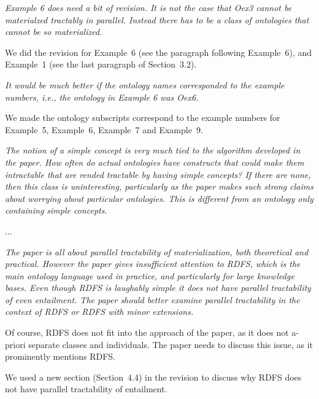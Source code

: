 \documentclass{article}
\let\quoteOld\quote
\let\endquoteOld\endquote
\renewenvironment{quote}{\quoteOld\itshape}{\endquoteOld}
\begin{document}
\begin{quote}
Example 6 does need a bit of revision.  It is not the case that Oex3 cannot
be materialzed tractably in parallel.  Instead there has to be a class of
ontologies that cannot be so materialized.
\end{quote}

We did the revision for Example~6 (see the paragraph following Example~6),
and Example~1 (see the last paragraph of Section~3.2).


\begin{quote}
It would be much better if the ontology names corresponded to the example
numbers, i.e., the ontology in Example 6 was Oex6.
\end{quote}

We made the ontology subscripts correspond to the example numbers
for Example~5, Example~6, Example~7 and Example~9.


\begin{quote}
The notion of a simple concept is very much tied to the algorithm developed
in the paper.  How often do actual ontologies have constructs that could
make them intractable that are rended tractable by having simple concepts?
If there are none, then this class is uninteresting, particularly as the
paper makes such strong claims about worrying about particular ontologies.
This is different from an ontology only containing simple concepts.
\end{quote}

...

\begin{quote}
The paper is all about parallel tractability of materialization, both
theoretical and practical.  However the paper gives insufficient attention
to RDFS, which is the main ontology language used in practice, and
particularly for large knowledge bases.  Even though RDFS is laughably
simple it does not have parallel tractability of even entailment.  The paper
should better examine parallel tractability in the context of RDFS or RDFS
with minor extensions.

Of course, RDFS does not fit into the approach of the paper, as it does not
a-priori separate classes and individuals.  The paper needs to discuss this
issue, as it prominently mentions RDFS.
\end{quote}

We used a new section (Section~4.4) in the revision to discuss why RDFS
does not have parallel tractability of entailment.
\end{document}
